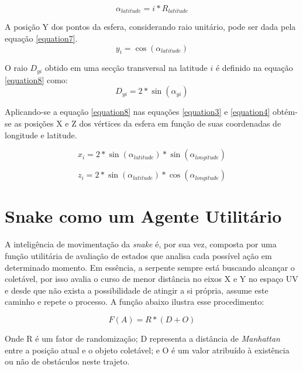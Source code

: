 \documentclass{vgtc}                          %
\begin{document}
\begin{equation}
\alpha_{latitude} = i * R_{latitude}
\label{equation6}
\end{equation}

A posição Y dos pontos da esfera, considerando raio unitário, pode ser dada pela equação \ref{equation7}.
\begin{equation}
y_{i} = \cos(\alpha_{latitude})
\label{equation7}
\end{equation}

O raio $D_{yi}$ obtido em uma secção transversal na latitude $i$ é definido na equação \ref{equation8} como:
\begin{equation}
D_{yi} = 2 * \sin(\alpha_{yi})
\label{equation8}
\end{equation}

Aplicando-se a equação \ref{equation8} nas equações \ref{equation3} e \ref{equation4} obtém-se as posições X e Z dos vértices da esfera em função de suas coordenadas de longitude e latitude.

\begin{equation}
x_{i} = 2 * \sin(\alpha_{latitude}) * \sin(\alpha_{longitude})
\label{equation9}
\end{equation}

\begin{equation}
z_{i} = 2 * \sin(\alpha_{latitude}) * \cos(\alpha_{longitude})
\label{equation10}
\end{equation}

\section{Snake como um Agente Utilitário} \label{sec:agent}

A inteligência de movimentação da \textit{snake} é, por sua vez, composta por uma função utilitária de avaliação de estados que analisa cada possível ação em determinado momento. Em essência, a serpente sempre está buscando alcançar o coletável, por isso avalia o curso de menor distância no eixos X e Y no espaço UV e desde que não exista a possibilidade de atingir a si própria, assume este caminho e repete o processo. A função abaixo ilustra esse procedimento:

\begin{equation}
F(A) = R * (D + O)
\label{equation11}
\end{equation}

Onde R é um fator de randomização; D representa a distância de \textit{Manhattan} entre a posição atual e o objeto coletável; e O é um valor atribuído à existência ou não de obstáculos neste trajeto.
\end{document}
